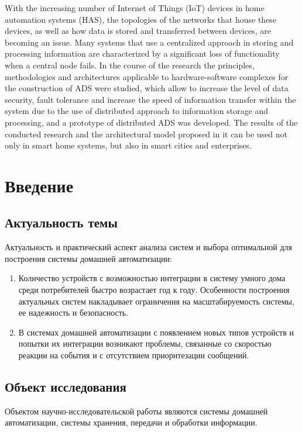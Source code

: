 \documentclass[a4paper,12pt]{article}
\begin{document}
With the increasing number of Internet of Things (IoT) devices in home automation systems (HAS), the topologies of the networks that house these devices, as well as how data is stored and transferred between devices, are becoming an issue. Many systems that use a centralized approach in storing and processing information are characterized by a significant loss of functionality when a central node fails. In the course of the research the principles, methodologies and architectures applicable to hardware-software complexes for the construction of ADS were studied, which allow to increase the level of data security, fault tolerance and increase the speed of information transfer within the system due to the use of distributed approach to information storage and processing, and a prototype of distributed ADS was developed. The results of the conducted research and the architectural model proposed in it can be used not only in smart home systems, but also in smart cities and enterprises.

\newpage

\section{Введение}

\subsection{Актуальность темы}

Актуальность и практический аспект анализа систем и выбора оптимальной для построения системы домашней автоматизации:

\begin{enumerate}
    \item	Количество устройств с возможностью интеграции в систему умного дома среди потребителей быстро возрастает год к году. Особенности построения актуальных систем накладывает ограничения на масштабируемость системы, ее надежность и безопасность.
    \item	В системах домашней автоматизации с появлением новых типов устройств и попытки их интеграции возникают проблемы, связанные со скоростью реакции на события и с отсутствием приоритезации сообщений.
\end{enumerate}

\subsection{Объект исследования}
Объектом научно-исследовательской работы являются системы домашней автоматизации, системы хранения, передачи и обработки информации.
\end{document}
